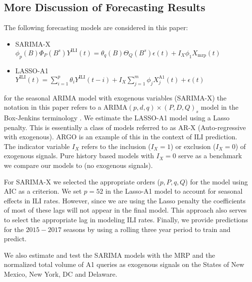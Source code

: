 \documentclass[12pt]{article}
\begin{document}


\subsection{More Discussion of Forecasting Results}

The following forecasting models are considered in this paper:
\begin{itemize}
\item SARIMA-X \\
$\phi_p(B)\Phi_P(B^s)Y^{\text{ILI}}(t) =  \theta_q(B)\Theta_Q(B^s)\epsilon(t) + I_X\phi_1 X_{\text{mrp}}(t)$
\item LASSO-A1 \\
$Y^{\text{ILI}}(t) = \sum_{i=1}^p \theta_i Y^{\text{ILI}}(t-i) +  I_X\sum_{j=1}^m \phi_j X_j^{\text{A1}}(t) + \epsilon(t)$
\end{itemize}

for the seasonal ARIMA model with exogenous variables (SARIMA-X) the notation in this paper refers to a ARIMA$(p,d,q)\times(P,D,Q)_s$ model in the Box-Jenkins terminology \citep{box_etal_2015}. We estimate the LASSO-A1 model using a Lasso penalty. This is essentially a class of models referred to as AR-X (Auto-regressive with exogenous). ARGO \cite{yang_etal_2015inference, yang_etal_2015} is an example of this in the context of ILI prediction. The indicator variable $I_X$ refers to the inclusion ($I_X=1$) or exclusion ($I_X=0$) of exogenous signals. Pure history based models with $I_X=0$ serve as a benchmark we compare our models to (no exogenous signals). 

For SARIMA-X we selected the appropriate orders ($p,P,q,Q$) for the model using AIC as a criterion. We set $p=52$ in the Lasso-A1 model to account for seasonal effects in ILI rates. However, since we are using the Lasso penalty the coefficients of most of these lags will not appear in the final model. This approach also serves to select the appropriate lag in modeling ILI rates. Finally, we provide predictions for the $2015-2017$ seasons by using a rolling three year period to train and predict.

We also estimate and test the SARIMA models with the MRP and the normalized total volume of A1 queries as exogenous signals on the States of New Mexico, New York, DC and Delaware. 
\end{document}
